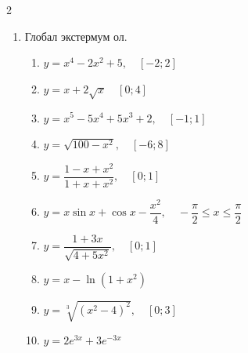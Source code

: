 \begin{multicols}{2}
\begin{enumerate}
\begin{enumerate}
        \item $y=x\sin x+\cos x-\dfrac{x^2}{4}, \quad -\dfrac{\pi}{2}\leq x\leq \dfrac{\pi}{2}$
        \item $y=\dfrac{1+3x}{\sqrt{4+5x^2}}$
        \item $y=x-\ln(1+x^2)$
        \item $y=\sqrt[3]{(x^2-4)^2}$
        \item $y=2e^{3x}+3e^{-3x}$
    \end{enumerate}
    \item Глобал экстермум ол.
    \begin{enumerate}
        \item $y=x^4-2x^2+5, \quad [-2;2]$
        \item $y=x+2\sqrt{x} \quad [0;4]$
        \item $y=x^5-5x^4+5x^3+2,\quad [-1;1]$
        \item $y=\sqrt{100-x^2}, \quad [-6;8]$
        \item $y=\dfrac{1-x+x^2}{1+x+x^2}, \quad [0;1]$
        \item $y=x\sin x+\cos x-\dfrac{x^2}{4}, \quad -\dfrac{\pi}{2}\leq x\leq \dfrac{\pi}{2}$
        \item $y=\dfrac{1+3x}{\sqrt{4+5x^2}}, \quad [0;1]$
        \item $y=x-\ln(1+x^2)$
        \item $y=\sqrt[3]{(x^2-4)^2}, \quad [0;3]$
        \item $y=2e^{3x}+3e^{-3x}$
    \end{enumerate}
\end{enumerate}
\end{multicols}
\newpage
